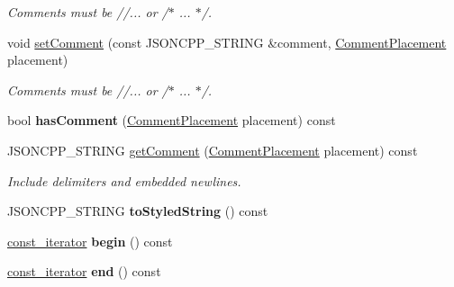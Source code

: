 \begin{DoxyCompactItemize}
\begin{DoxyCompactList}\small\item\em Comments must be //... or /$\ast$ ... $\ast$/. \end{DoxyCompactList}\item 
void \hyperlink{class_json_1_1_value_a2c5d13a5f45eb77e912008778e65b27f}{set\+Comment} (const J\+S\+O\+N\+C\+P\+P\+\_\+\+S\+T\+R\+I\+NG \&comment, \hyperlink{namespace_json_a4fc417c23905b2ae9e2c47d197a45351}{Comment\+Placement} placement)\hypertarget{class_json_1_1_value_a2c5d13a5f45eb77e912008778e65b27f}{}\label{class_json_1_1_value_a2c5d13a5f45eb77e912008778e65b27f}

\begin{DoxyCompactList}\small\item\em Comments must be //... or /$\ast$ ... $\ast$/. \end{DoxyCompactList}\item 
bool {\bfseries has\+Comment} (\hyperlink{namespace_json_a4fc417c23905b2ae9e2c47d197a45351}{Comment\+Placement} placement) const \hypertarget{class_json_1_1_value_a06567a00363cab9601be7e31336db03a}{}\label{class_json_1_1_value_a06567a00363cab9601be7e31336db03a}

\item 
J\+S\+O\+N\+C\+P\+P\+\_\+\+S\+T\+R\+I\+NG \hyperlink{class_json_1_1_value_a5c3d0767cddbcba71a41bf52ead10525}{get\+Comment} (\hyperlink{namespace_json_a4fc417c23905b2ae9e2c47d197a45351}{Comment\+Placement} placement) const \hypertarget{class_json_1_1_value_a5c3d0767cddbcba71a41bf52ead10525}{}\label{class_json_1_1_value_a5c3d0767cddbcba71a41bf52ead10525}

\begin{DoxyCompactList}\small\item\em Include delimiters and embedded newlines. \end{DoxyCompactList}\item 
J\+S\+O\+N\+C\+P\+P\+\_\+\+S\+T\+R\+I\+NG {\bfseries to\+Styled\+String} () const \hypertarget{class_json_1_1_value_a1b893476675b8f1c83f6f60a0938089b}{}\label{class_json_1_1_value_a1b893476675b8f1c83f6f60a0938089b}

\item 
\hyperlink{class_json_1_1_value_const_iterator}{const\+\_\+iterator} {\bfseries begin} () const \hypertarget{class_json_1_1_value_ac12df0d6980600c5bac908ed0f64856e}{}\label{class_json_1_1_value_ac12df0d6980600c5bac908ed0f64856e}

\item 
\hyperlink{class_json_1_1_value_const_iterator}{const\+\_\+iterator} {\bfseries end} () const \hypertarget{class_json_1_1_value_a596da1926b2f2a4056bff2edb713eb0b}{}\label{class_json_1_1_value_a596da1926b2f2a4056bff2edb713eb0b}


\end{DoxyCompactItemize}
